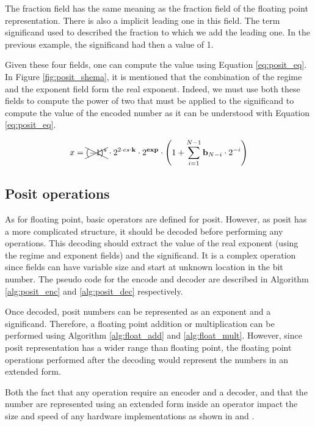 The fraction field has the same meaning as the fraction field of the floating point representation. There is also a implicit leading one in this field. The term significand used to described the fraction to which we add the leading one. In the previous example, the significand had then a value of 1.

Given these four fields, one can compute the value using Equation \ref{eq:posit_eq}. In Figure \ref{fig:posit_shema}, it is mentioned that the combination of the regime and the exponent field form the real exponent. Indeed, we must use both these fields to compute the power of two that must be applied to the significand to compute the value of the encoded number as it can be understood with Equation \ref{eq:posit_eq}.

\begin{equation}
x = \xcancel{(-1)^s} \cdot 2^{2\cdot es \cdot \text{\textbf{k}}} \cdot 2^\text{\textbf{exp}} \cdot \left( 1 + \sum_{i=1}^{N-1}  \text{\textbf{b}}_{N-i} \cdot 2^{-i} \right)
\label{eq:posit_eq}
\end{equation}

\subsection{Posit operations}

As for floating point, basic operators are defined for posit. However, as posit has a more complicated structure, it should be decoded before performing any operations. This decoding should extract the value of the real exponent (using the regime and exponent fields) and the significand. It is a complex operation since fields can have variable size and start at unknown location in the bit number. The pseudo code for the encode and decoder are described in Algorithm \ref{alg:posit_enc} and \ref{alg:posit_dec} respectively.

Once decoded, posit numbers can be represented as an exponent and a significand. Therefore, a floating point addition or multiplication can be performed using Algorithm \ref{alg:float_add} and \ref{alg:float_mult}.  However, since posit representation has a wider range than floating point, the floating point operations performed after the decoding would represent the numbers in an extended form.

Both the fact that any operation require an encoder and a decoder, and that the number are represented using an extended form inside an operator impact the size and speed of any hardware implementations as shown in \cite{other_fpga} and \cite{other_fpga_2}.

